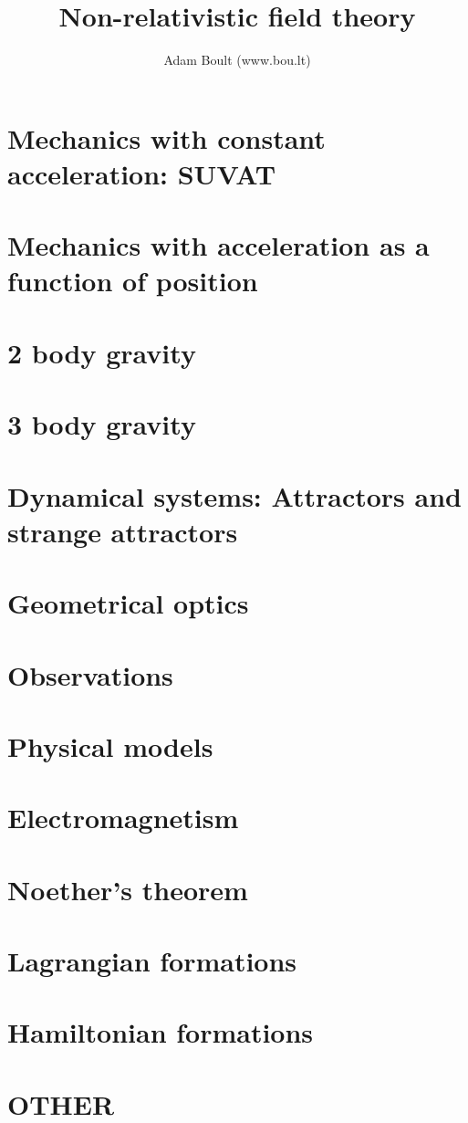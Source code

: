 \documentclass[oneside]{book}
\begin{document}
\author{Adam Boult (www.bou.lt)}
\title{Non-relativistic field theory}
\maketitle

\setcounter{tocdepth}{0}
\tableofcontents



\part{Mechanics with constant acceleration: SUVAT}


\part{Mechanics with acceleration as a function of position}



\part{2 body gravity}


\part{3 body gravity}

\part{Dynamical systems: Attractors and strange attractors}

\part{Geometrical optics}

\part{Observations}

\part{Physical models}





\part{Electromagnetism}


\part{Noether's theorem}


\part{Lagrangian formations}


\part{Hamiltonian formations}


\part{OTHER}

\end{document}
